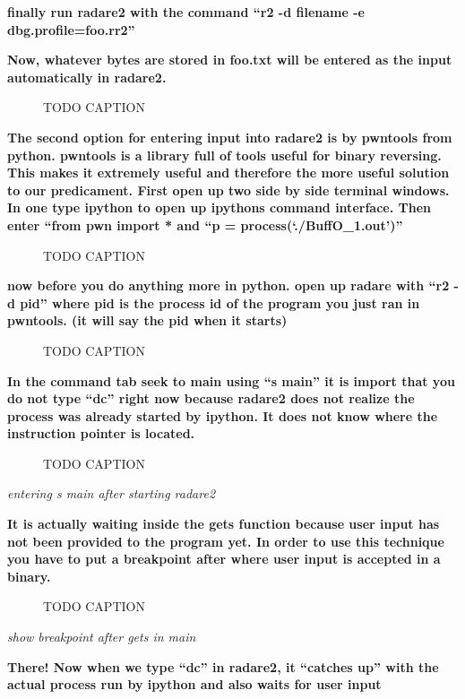 \documentclass[letterpaper]{article}
\newcommand{\sitfig}[3]{
\begin{figure}[H]
\centering
\makebox[\textwidth][c]{
#2
}
\caption{#3}
\label{#1}
\end{figure}
}
\newcommand{\sitgfx}[4][scale=1.0]{
\sitfig{#3}{\texttt{[image: \#2]}}{#4}
}
\begin{document}
\textbf{finally run radare2 with the command ``r2 -d filename -e dbg.profile=foo.rr2''}

\textbf{Now, whatever bytes are stored in foo.txt will be entered as the input automatically in radare2.}

  
\sitgfx[width=5.8335in,height=3.6457in]{FINALWORKINGDOCFORMERLYPRECURSOR-img097.png}{fig:unk}{TODO CAPTION}
 \textbf{ }

\textbf{The second option for entering input into radare2 is by pwntools from python. pwntools is a library full of
tools useful for binary reversing. This makes it extremely useful and therefore the more useful solution to our
predicament.\newline
First open up two side by side terminal windows. In one type ipython to open up ipythons command interface. Then enter
``from pwn import *{\textquotedbl} and ``p = process(`./BuffO\_1.out')''}

  
\sitgfx[width=5.8335in,height=3.6457in]{FINALWORKINGDOCFORMERLYPRECURSOR-img098.png}{fig:unk}{TODO CAPTION}
 

\textbf{now before you do anything more in python. open up radare with ``r2 -d pid'' where pid is the process id of the
program you just ran in pwntools. (it will say the pid when it starts)}

  
\sitgfx[width=5.8335in,height=3.6457in]{FINALWORKINGDOCFORMERLYPRECURSOR-img099.png}{fig:unk}{TODO CAPTION}
 

\textbf{In the command tab seek to main using ``s main'' it is import that you do not type ``dc'' right now because
radare2 does not realize the process was already started by ipython. It does not know where the instruction pointer is
located.}

  
\sitgfx[width=5.8335in,height=3.6457in]{FINALWORKINGDOCFORMERLYPRECURSOR-img100.png}{fig:unk}{TODO CAPTION}
 

\textit{entering s main after starting radare2}

\textbf{It is actually waiting inside the gets function because user input has not been provided to the program yet. In
order to use this technique you have to put a breakpoint after where user input is accepted in a binary.}

  
\sitgfx[width=5.8335in,height=3.6457in]{FINALWORKINGDOCFORMERLYPRECURSOR-img101.png}{fig:unk}{TODO CAPTION}
 

\textit{show breakpoint after gets in main}

\textbf{There! Now when we type ``dc'' in radare2, it ``catches up'' with the actual process run by ipython and also
waits for user input}
\end{document}
